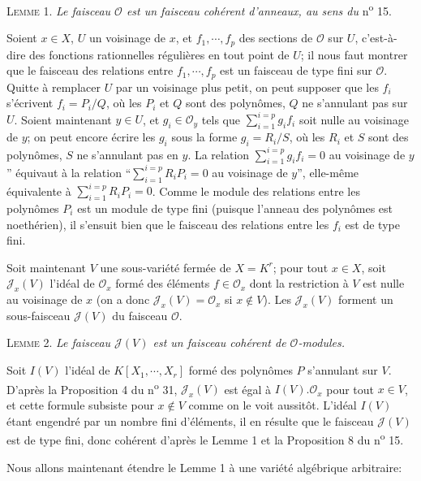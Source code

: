 \textsc{Lemme} 1. \textit{Le faisceau $\mathcal{O}$ est un faisceau cohérent d'anneaux, au sens du} n\textsuperscript{o} 15.

Soient $x \in X$, $U$ un voisinage de $x$, et $f_1 , \cdots , f_p$ des sections de $\mathcal{O}$ sur $U$, c'est-à-dire des fonctions rationnelles régulières en tout point de $U$; il nous faut montrer que le faisceau des relations entre $f_1 , \cdots , f_p$ est un faisceau de type fini sur $\mathcal{O}$. Quitte à remplacer $U$ par un voisinage plus petit, on peut supposer que les $f_i$ s'écrivent $f_i = P_i/Q$, où les $P_i$ et $Q$ sont des polynômes, $Q$ ne s'annulant pas sur $U$. Soient maintenant $y \in U$, et $g_i \in \mathcal{O}_y$ tels que $\sum_{i=1}^{i=p} g_i f_i$ soit nulle au voisinage de $y$; on peut encore écrire les $g_i$ sous la forme $g_i = R_i/S$, où les $R_i$ et $S$ sont des polynômes, $S$ ne s'annulant pas en $y$. La relation $\sum_{i=1}^{i=p} g_i f_i = 0$ au voisinage de $y$'' équivaut à la relation ``$\sum_{i=1}^{i=p} R_i P_i = 0$ au voisinage de $y$'', elle-même équivalente à $\sum_{i=1}^{i=p} R_i P_i = 0$. Comme le module des relations entre les polynômes $P_i$ est un module de type fini (puisque l'anneau des polynômes est noethérien), il s'ensuit bien que le faisceau des relations entre les $f_i$ est de type fini.

Soit maintenant $V$ une sous-variété fermée de $X = K^r$; pour tout $x \in X$, soit $\mathcal{J}_x(V)$ l'idéal de $\mathcal{O}_x$ formé des éléments $f \in \mathcal{O}_x$ dont la restriction à $V$ est nulle au voisinage de $x$ (on a donc $\mathcal{J}_x(V) = \mathcal{O}_x$ si $x \notin V$). Les $\mathcal{J}_x(V)$ forment un sous-faisceau $\mathcal{J}(V)$ du faisceau $\mathcal{O}$.

\textsc{Lemme} 2. \textit{Le faisceau $\mathcal{J}(V)$ est un faisceau cohérent de $\mathcal{O}$-modules.}

Soit $I(V)$ l'idéal de $K[X_1, \cdots , X_r]$ formé des polynômes $P$ s'annulant sur $V$. D'après la Proposition 4 du n\textsuperscript{o} 31, $\mathcal{J}_x(V)$ est égal à $I(V).\mathcal{O}_x$ pour tout $x \in V$, et
cette formule subsiste pour $x \notin V$ comme on le voit aussitôt. L'idéal $I(V)$ étant engendré par un nombre fini d'éléments, il en résulte que le faisceau $\mathcal{J}(V)$ est de type fini, donc cohérent d'après le Lemme 1 et la Proposition 8 du n\textsuperscript{o} 15.

Nous allons maintenant étendre le Lemme 1 à une variété algébrique arbitraire:

